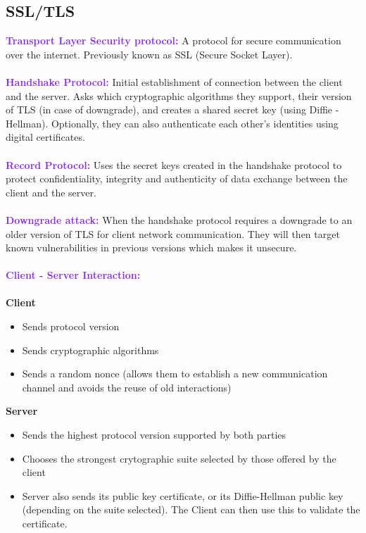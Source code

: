 \documentclass[a4paper,10pt]{article}
\begin{document}
\subsection{SSL/TLS}
\textcolor{BlueViolet}{\textbf{Transport Layer Security protocol:}} A protocol for secure communication over the internet. Previously known as SSL (Secure Socket Layer). \\\\
\textcolor{BlueViolet}{\textbf{Handshake Protocol:}} Initial establishment of connection between the client and the server. Asks which cryptographic algorithms they support, their version of TLS (in case of downgrade), and creates a shared secret key (using Diffie - Hellman). Optionally, they can also authenticate each other's identities using digital certificates. \\\\
\textcolor{BlueViolet}{\textbf{Record Protocol:}} Uses the secret keys created in the handshake protocol to protect confidentiality, integrity and authenticity of data exchange between the client and the server. \\\\
\textcolor{BlueViolet}{\textbf{Downgrade attack:}} When the handshake protocol requires a downgrade to an older version of TLS for client network communication. They will then target known vulnerabilities in previous versions which makes it unsecure. \\\\
\textcolor{BlueViolet}{\textbf{Client - Server Interaction:}} \\\\
\textbf{Client} 
\begin{itemize}
\item Sends protocol version 
\item Sends cryptographic algorithms
\item Sends a random nonce (allows them to establish a new communication channel and avoids the reuse of old interactions)
\end{itemize}
\textbf{Server}
\begin{itemize}
\item Sends the highest protocol version supported by both parties 
\item Chooses the strongest crytographic suite selected by those offered by the client 
\item Server also sends its public key certificate, or its Diffie-Hellman public key (depending on the suite selected). The Client can then use this to validate the certificate. 
\end{itemize} 
\end{document}
